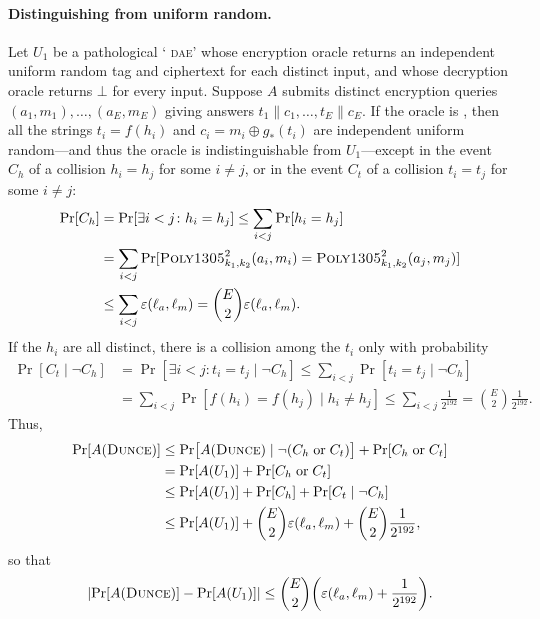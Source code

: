 \documentclass{article}
\def\operatorsc#1{{%
  \ifmmode\let\next=\operatorname\else\let\next=\relax\fi\next{\textsc{#1}}}}
\def\Poly#1/{\operatorsc{Poly#1}}
\def\DUNCE/{\operatorsc{Dunce}}
\def\DAE{%
  \ifmmode\def\next{\operatorname{DAE}}%
    \else\def\next/{\textsc{dae}}%
  \fi\next}
\newcommand{\concat}{\mathbin\|}
\newcommand{\given}{\mathrel|}
\newcommand{\collisionbound}{\varepsilon}
\begin{document}
\paragraph*{Distinguishing \DUNCE/ from uniform random.}
Let $U_1$ be a pathological `\DAE/' whose encryption oracle returns an
 independent uniform random tag and ciphertext for each distinct
 input, and whose decryption oracle returns $\bot$ for every input.
Suppose $A$ submits distinct encryption queries
 $(a_1, m_1), \dotsc, (a_E, m_E)$
 giving answers
 $t_1 \concat c_1, \dotsc, t_E \concat c_E$.
If the oracle is \DUNCE/, then all the strings $t_i = f(h_i)$ and
 $c_i = m_i \oplus g_*(t_i)$ are independent uniform random---and thus
 the oracle is indistinguishable from $U_1$---except in the event
 $C_h$ of a collision $h_i = h_j$ for some $i \ne j$, or in the event
 $C_t$ of a collision $t_i = t_j$ for some $i \ne j$:
%
\begin{align*}
  \Pr[C_h]
    &= \Pr[\exists i<j\colon h_i = h_j]
     \leq \sum_{i<j} \Pr[h_i = h_j] \\
    &= \sum_{i<j}
         \Pr[\Poly1305/^2_{k_1,k_2}(a_i, m_i)
               = \Poly1305/^2_{k_1,k_2}(a_j, m_j)] \\
    &\leq \sum_{i<j} \collisionbound(\ell_a, \ell_m)
     = \binom{E}{2} \collisionbound(\ell_a, \ell_m).
\end{align*}
%
If the $h_i$ are all distinct, there is a collision among the $t_i$
 only with probability
%
\begin{align*}
  \Pr[C_t \given \lnot C_h]
    &= \Pr[\exists i<j\colon t_i = t_j \given \lnot C_h]
     \leq \sum_{i<j} \Pr[t_i = t_j \given \lnot C_h] \\
    &= \sum_{i<j} \Pr[f(h_i) = f(h_j) \given h_i \ne h_j]
     \leq \sum_{i<j} \frac{1}{2^{192}}
     = \binom{E}{2} \frac{1}{2^{192}}.
\end{align*}
%
Thus,
%
\begin{align*}
  \Pr[A(\DUNCE/)]
  &\leq \Pr\bigl[A(\DUNCE/) \given
            \lnot (C_h \mathrel{\text{or}} C_t)\bigr]
        + \Pr[C_h \mathrel{\text{or}} C_t] \\
  &= \Pr[A(U_1)] + \Pr[C_h \mathrel{\text{or}} C_t] \\
  &\leq \Pr[A(U_1)] + \Pr[C_h] + \Pr[C_t \given \lnot C_h] \\
  &\leq \Pr[A(U_1)] + \binom{E}{2} \collisionbound(\ell_a, \ell_m)
        + \binom{E}{2} \frac{1}{2^{192}},
\end{align*}
%
 so that
\[
  \lvert\Pr[A(\DUNCE/)] - \Pr[A(U_1)]\rvert
  \leq \binom{E}{2}
       \biggl(\collisionbound(\ell_a, \ell_m) + \frac{1}{2^{192}}\biggr).
\]
\end{document}
